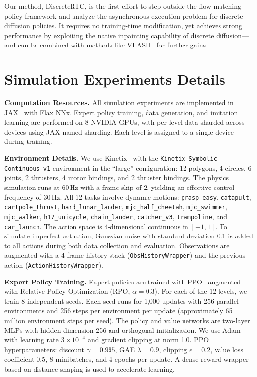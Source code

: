 \documentclass{article}
\begin{document}
Our method, DiscreteRTC, is the first effort to step outside the flow-matching policy framework and analyze the asynchronous execution problem for discrete diffusion policies. It requires no training-time modification, yet achieves strong performance by exploiting the native inpainting capability of discrete diffusion---and can be combined with methods like VLASH~\citep{tang2025vlash} for further gains.



\section{Simulation Experiments Details}
\label{app: simexp}

\textbf{Computation Resources.}
All simulation experiments are implemented in JAX~\citep{jax2018github} with Flax NNx.
Expert policy training, data generation, and imitation learning are performed on 8 NVIDIA GPUs, with per-level data sharded across devices using JAX named sharding.
Each level is assigned to a single device during training.

\textbf{Environment Details.}
We use Kinetix~\citep{matthews2024kinetix} with the \texttt{Kinetix-Symbolic-Continuous-v1} environment in the ``large'' configuration: 12 polygons, 4 circles, 6 joints, 2 thrusters, 4 motor bindings, and 2 thruster bindings.
The physics simulation runs at 60\,Hz with a frame skip of 2, yielding an effective control frequency of 30\,Hz.
All 12 tasks involve dynamic motions: \texttt{grasp\_easy}, \texttt{catapult}, \texttt{cartpole\_thrust}, \texttt{hard\_lunar\_lander}, \texttt{mjc\_half\_cheetah}, \texttt{mjc\_swimmer}, \texttt{mjc\_walker}, \texttt{h17\_unicycle}, \texttt{chain\_lander}, \texttt{catcher\_v3}, \texttt{trampoline}, and \texttt{car\_launch}.
The action space is 4-dimensional continuous in $[-1, 1]$.
To simulate imperfect actuation, Gaussian noise with standard deviation 0.1 is added to all actions during both data collection and evaluation.
Observations are augmented with a 4-frame history stack (\texttt{ObsHistoryWrapper}) and the previous action (\texttt{ActionHistoryWrapper}).

\textbf{Expert Policy Training.}
Expert policies are trained with PPO~\citep{schulman2017proximal} augmented with Relative Policy Optimization (RPO, $\alpha=0.3$).
For each of the 12 levels, we train 8 independent seeds.
Each seed runs for 1{,}000 updates with 256 parallel environments and 256 steps per environment per update (approximately 65 million environment steps per seed).
The policy and value networks are two-layer MLPs with hidden dimension 256 and orthogonal initialization.
We use Adam with learning rate $3 \times 10^{-4}$ and gradient clipping at norm 1.0.
PPO hyperparameters: discount $\gamma=0.995$, GAE $\lambda=0.9$, clipping $\epsilon=0.2$, value loss coefficient 0.5, 8 minibatches, and 4 epochs per update.
A dense reward wrapper based on distance shaping is used to accelerate learning.
\end{document}
